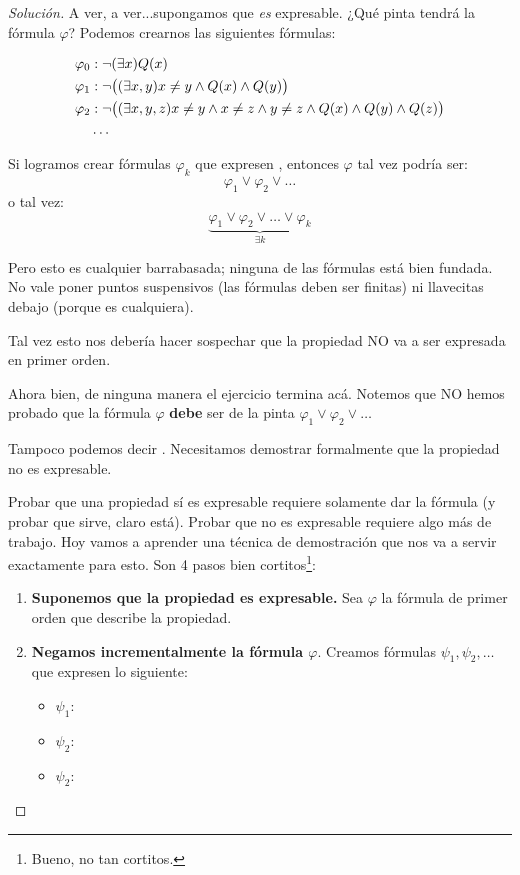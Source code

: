 \documentclass[10pt,a4paper]{article}
\def\p{\psi}
\newenvironment{solution}
  {\renewcommand\qedsymbol{$\blacksquare$}\begin{proof}[Solución]}
  {\end{proof}}
\begin{document}
\begin{solution}
A ver, a ver...supongamos que \emph{es} expresable. ¿Qué pinta tendrá la fórmula $\varphi$? Podemos crearnos las siguientes fórmulas:

\begin{align*}
\varphi_0 &: \neg (\exists x) Q(x)\\
\varphi_1 &: \neg \big{(}(\exists x, y) x\neq y \land Q(x) \land Q(y) \big{)}\\
\varphi_2 &: \neg \big{(}(\exists x,y,z) x\neq y \land x \neq z \land y\neq z \land Q(x) \land Q(y) \land Q(z) \big{)}\\
&\dots
\end{align*}

Si logramos crear fórmulas $\varphi_k$ que expresen , entonces $\varphi$ tal vez podría ser:
 $$\varphi_1 \lor \varphi_2 \lor \dots$$
  o tal vez:
  $$\underbrace{\varphi_1 \lor \varphi_2 \lor \dots \lor \varphi_k}_{{\exists k}}$$
  
  Pero esto es cualquier barrabasada; ninguna de las fórmulas está bien fundada. No vale poner puntos suspensivos (las fórmulas deben ser finitas) ni llavecitas debajo (porque es cualquiera).
  
  Tal vez esto nos debería hacer sospechar que la propiedad NO va a ser expresada en primer orden.
  
  Ahora bien, de ninguna manera el ejercicio termina acá. Notemos que NO hemos probado que la fórmula $\varphi$ \textbf{debe} ser de la pinta $\varphi_1 \lor \varphi_2 \lor \dots$
  
  Tampoco podemos decir . Necesitamos demostrar formalmente que la propiedad no es expresable.
  
  Probar que una propiedad sí es expresable requiere solamente dar la fórmula (y probar que sirve, claro está). Probar que no es expresable requiere algo más de trabajo. Hoy vamos a aprender una técnica de demostración que nos va a servir exactamente para esto. Son 4 pasos bien cortitos\footnote{Bueno, no tan cortitos.}:
  
  \begin{enumerate}
  	\item \textbf{Suponemos que la propiedad es expresable.} Sea $\varphi$ la fórmula de primer orden que describe la propiedad.
  	\item \textbf{Negamos incrementalmente la fórmula $\varphi$}. Creamos fórmulas $\p_1, \p_2, \dots$ que expresen lo siguiente:
  	\begin{itemize}
  		\item $\p_1$: 
  		\item $\p_2$: 
  		\item $\p_2$: 
  		

\end{itemize}
\end{enumerate}
\end{solution}
\end{document}

